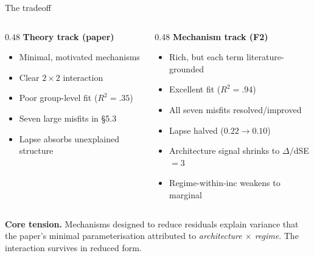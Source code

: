 \documentclass[10pt,aspectratio=169]{beamer}
\newcommand{\hl}[1]{{\color{hlblue}\textbf{#1}}}
\newcommand{\bad}[1]{{\color{hlred}#1}}
\begin{document}
\begin{frame}{The tradeoff}
\begin{columns}[t]
\begin{column}{0.48\textwidth}
\textbf{\color{hlblue}Theory track (paper)}
\begin{itemize}\itemsep0.2em
  \item Minimal, motivated mechanisms
  \item Clear $2\!\times\!2$ interaction
  \item \bad{Poor group-level fit ($R^2 = .35$)}
  \item \bad{Seven large misfits in \S5.3}
  \item Lapse absorbs unexplained structure
\end{itemize}
\end{column}

\begin{column}{0.48\textwidth}
\textbf{\color{hlgold}Mechanism track (F2)}
\begin{itemize}\itemsep0.2em
  \item Rich, but each term literature-grounded
  \item Excellent fit ($R^2 = .94$)
  \item All seven misfits resolved/improved
  \item Lapse halved ($0.22 \to 0.10$)
  \item \bad{Architecture signal shrinks to $\Delta/$dSE $= 3$}
  \item \bad{Regime-within-inc weakens to marginal}
\end{itemize}
\end{column}
\end{columns}

\vspace{1em}
\hl{Core tension.} Mechanisms designed to reduce residuals
explain variance that the paper's minimal parameterisation
attributed to \emph{architecture $\times$ regime}. The interaction survives
in reduced form.
\end{frame}
\end{document}
